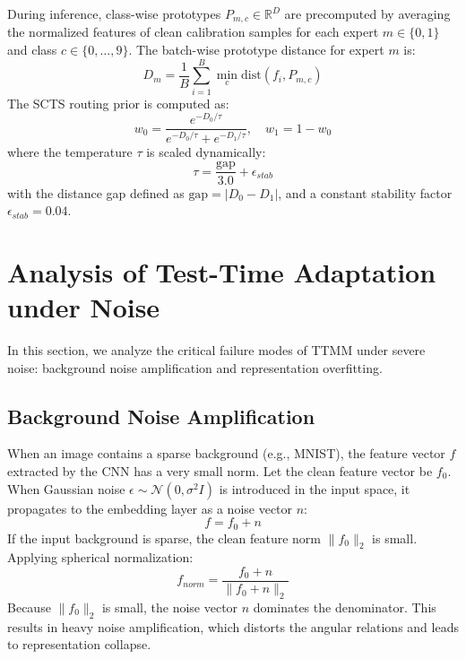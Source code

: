 \documentclass{article}
\theoremstyle{plain}
\theoremstyle{definition}
\theoremstyle{remark}
\begin{document}
During inference, class-wise prototypes $P_{m, c} \in \mathbb{R}^D$ are precomputed by averaging the normalized features of clean calibration samples for each expert $m \in \{0, 1\}$ and class $c \in \{0, \dots, 9\}$. The batch-wise prototype distance for expert $m$ is:
\begin{equation}
    D_m = \frac{1}{B} \sum_{i=1}^B \min_{c} \text{dist}(f_i, P_{m, c})
\end{equation}
The SCTS routing prior is computed as:
\begin{equation}
    w_0 = \frac{e^{-D_0 / \tau}}{e^{-D_0 / \tau} + e^{-D_1 / \tau}}, \quad w_1 = 1 - w_0
\end{equation}
where the temperature $\tau$ is scaled dynamically:
\begin{equation}
    \tau = \frac{\text{gap}}{3.0} + \epsilon_{stab}
\end{equation}
with the distance gap defined as $\text{gap} = |D_0 - D_1|$, and a constant stability factor $\epsilon_{stab} = 0.04$.

\section{Analysis of Test-Time Adaptation under Noise}
In this section, we analyze the critical failure modes of TTMM under severe noise: background noise amplification and representation overfitting.

\subsection{Background Noise Amplification}
When an image contains a sparse background (e.g., MNIST), the feature vector $f$ extracted by the CNN has a very small norm. Let the clean feature vector be $f_0$. When Gaussian noise $\epsilon \sim \mathcal{N}(0, \sigma^2 I)$ is introduced in the input space, it propagates to the embedding layer as a noise vector $n$:
\begin{equation}
    f = f_0 + n
\end{equation}
If the input background is sparse, the clean feature norm $\|f_0\|_2$ is small. Applying spherical normalization:
\begin{equation}
    f_{norm} = \frac{f_0 + n}{\|f_0 + n\|_2}
\end{equation}
Because $\|f_0\|_2$ is small, the noise vector $n$ dominates the denominator. This results in heavy noise amplification, which distorts the angular relations and leads to representation collapse. 
\end{document}
